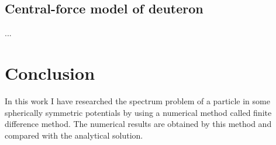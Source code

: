 \documentclass[a4paper, 12pt]{article}
\begin{document}
\subsection{Central-force model of deuteron}


...

\section{Conclusion}
In this work I have researched the spectrum problem of a  particle in some spherically symmetric potentials by using a numerical method called finite difference method. The numerical results are obtained by this method and compared with the analytical solution. 

















%
%
\end{document}
